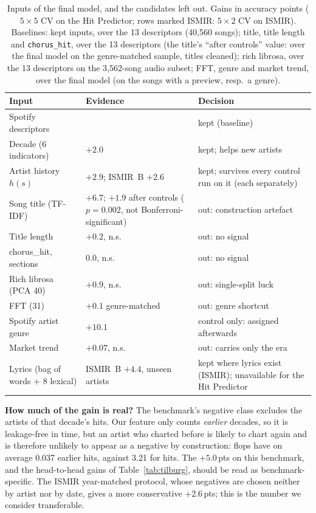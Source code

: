 \documentclass[conference]{IEEEtran}
\newcommand{\pp}{\,pts}
\begin{document}
\begin{table}[t]
\centering
\caption{Inputs of the final model, and the candidates left out. Gains in accuracy points ($5{\times}5$ CV on the
Hit Predictor; rows marked ISMIR: $5{\times}2$ CV on ISMIR). Baselines: kept inputs, over the 13 descriptors (40{,}560 songs); title, title length and
\texttt{chorus\_hit}, over the 13 descriptors (the title's ``after controls'' value: over the final model on the
genre-matched sample, titles cleaned); rich librosa, over the 13 descriptors on the 3{,}562-song audio
subset; FFT, genre and market trend, over the final model (on the songs with a preview, resp.\ a genre).}
\label{tab:final}
\footnotesize
\setlength{\tabcolsep}{3pt}
\begin{tabular}{@{}>{\raggedright\arraybackslash}p{2.75cm}>{\raggedright\arraybackslash}p{1.75cm}>{\raggedright\arraybackslash}p{3.15cm}@{}}
\toprule
Input & Evidence & Decision \\
\midrule
13 Spotify descriptors & 0.782 & kept (baseline) \\
Decade (6 indicators) & $+2.0$ & kept; helps new artists \\
Artist history $h(s)$ & $+2.9$; ISMIR~B $+2.6$ & kept; survives every control run on it (each separately) \\
\midrule
Song title (TF-IDF) & $+6.7$; $+1.9$ after controls ($p=0.002$, not Bonferroni-significant) & out: construction artefact \\
Title length & $+0.2$, n.s. & out: no signal \\
chorus\_hit, sections & $0.0$, n.s. & out: no signal \\
Rich librosa (PCA 40) & $+0.9$, n.s. & out: single-split luck \\
FFT (31) & $+0.1$ genre-matched & out: genre shortcut \\
Spotify artist genre & $+10.1$ & control only: assigned afterwards \\
Market trend & $+0.07$, n.s. & out: carries only the era \\
Lyrics (bag of words + 8 lexical) & ISMIR~B $+4.4$, unseen artists & kept where lyrics exist (ISMIR); unavailable for the Hit Predictor \\
\bottomrule
\end{tabular}
\end{table}

\textbf{How much of the gain is real?} The benchmark's negative class excludes the artists
of that decade's hits. Our feature only counts \emph{earlier} decades, so it is leakage-free
in time, but an artist who charted before is likely to chart again and is therefore
unlikely to appear as a negative by construction: flops have on average 0.037 earlier hits,
against 3.21 for hits. The $+5.0$\pp{} on this benchmark, and the head-to-head gains of
Table~\ref{tab:tilburg}, should be read as benchmark-specific. The ISMIR year-matched
protocol, whose negatives are chosen neither by artist nor by date, gives a more
conservative $+2.6$\pp; this is the number we consider transferable.
\end{document}
